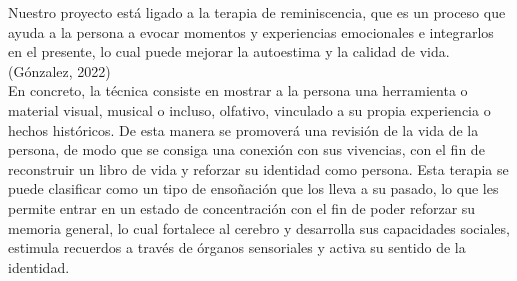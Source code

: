 Nuestro proyecto está ligado a la terapia de reminiscencia, que es un proceso que ayuda a la persona a evocar momentos y experiencias emocionales e integrarlos en el presente, lo cual puede mejorar la autoestima y la calidad de vida.(Gónzalez, 2022)\\

En concreto, la técnica consiste en mostrar a la persona una herramienta o material visual, musical o incluso, olfativo, vinculado a su propia experiencia o hechos históricos. De esta manera se promoverá una revisión de la vida de la persona, de modo que se consiga una conexión con sus vivencias, con el fin de reconstruir un libro de vida y reforzar su identidad como persona.  Esta terapia se puede clasificar como un tipo de ensoñación que los lleva a su pasado, lo que les permite entrar en un estado de concentración con el fin de poder reforzar su memoria general, lo cual fortalece al cerebro y desarrolla sus capacidades sociales, estimula recuerdos a través de órganos sensoriales y activa su sentido de la identidad.\\


